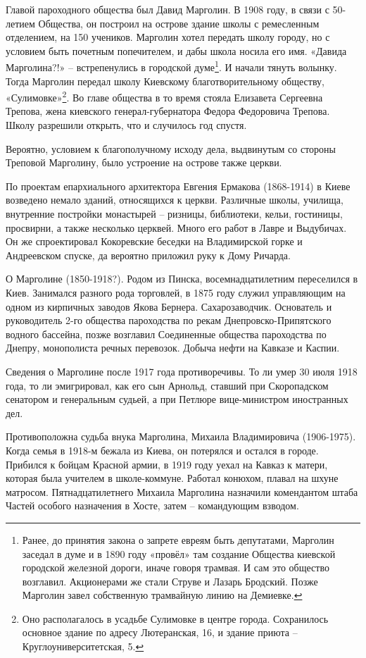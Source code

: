 Главой пароходного общества был Давид Марголин. В 1908 году, в связи с 50-летием Общества, он построил на острове здание школы с ремесленным отделением, на 150 учеников. Марголин хотел передать школу городу, но с условием быть почетным попечителем, и дабы школа носила его имя. «Давида Марголина?!» – встрепенулись в городской думе\footnote{Ранее, до принятия закона о запрете евреям быть депутатами, Марголин  заседал в думе и в 1890 году «провёл» там создание Общества киевской городской железной дороги, иначе говоря трамвая. И сам это общество возглавил. Акционерами же стали Струве и Лазарь Бродский. Позже Марголин завел собственную трамвайную линию на Демиевке.}. И начали тянуть волынку. Тогда Марголин передал школу Киевскому благотворительному обществу, «Сулимовке»\footnote{Оно располагалось в усадьбе Сулимовке в центре города. Сохранилось основное здание по адресу Лютеранская, 16, и здание приюта – Круглоуниверситетская, 5.}. Во главе общества в то время стояла Елизавета Сергеевна Трепова, жена киевского генерал-губернатора Федора Федоровича Трепова. Школу разрешили открыть, что и случилось год спустя.

Вероятно, условием к благополучному исходу дела, выдвинутым со стороны Треповой Марголину, было устроение на острове также церкви.

По проектам епархиального архитектора Евгения Ермакова (1868-1914) в Киеве возведено немало зданий, относящихся к церкви. Различные школы, училища, внутренние постройки монастырей – ризницы, библиотеки, кельи, гостиницы, просвирни, а также несколько церквей. Много его работ в Лавре и Выдубичах. Он же спроектировал Кокоревские беседки на Владимирской горке и Андреевском спуске, да вероятно приложил руку к Дому Ричарда.

О Марголине (1850-1918?). Родом из Пинска, восемнадцатилетним переселился в Киев. Занимался разного рода торговлей, в 1875 году служил управляющим на одном из кирпичных заводов Якова Бернера. Сахарозаводчик. Основатель и руководитель 2-го общества пароходства по рекам Днепровско-Припятского водного бассейна, позже возглавил Соединенные общества пароходства по Днепру, монополиста речных перевозок. Добыча нефти на Кавказе и Каспии. 

Сведения о Марголине после 1917 года противоречивы. То ли умер 30 июля 1918 года, то ли эмигрировал, как его сын Арнольд, ставший при Скоропадском сенатором и генеральным судьей, а при Петлюре вице-министром иностранных дел.

Противоположна судьба внука Марголина, Михаила Владимировича (1906-1975). Когда семья в 1918-м бежала из Киева, он потерялся и остался в городе. Прибился к бойцам Красной армии, в 1919 году уехал на Кавказ к матери, которая была учителем в школе-коммуне. Работал конюхом, плавал на шхуне матросом. Пятнадцатилетнего Михаила Марголина назначили комендантом штаба Частей особого назначения в Хосте, затем – командующим взводом. 


